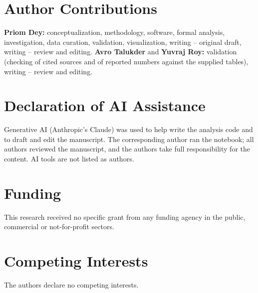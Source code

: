 \documentclass[11pt,a4paper]{article}
\begin{document}
\section*{Author Contributions}
\textbf{Priom Dey:} conceptualization, methodology, software, formal analysis, investigation, data curation, validation, visualization, writing -- original draft, writing -- review and editing. \textbf{Avro Talukder} and \textbf{Yuvraj Roy:} validation (checking of cited sources and of reported numbers against the supplied tables), writing -- review and editing.

\section*{Declaration of AI Assistance}
Generative AI (Anthropic's Claude) was used to help write the analysis code and to draft and edit the manuscript. The corresponding author ran the notebook; all authors reviewed the manuscript, and the authors take full responsibility for the content. AI tools are not listed as authors.

\section*{Funding}
This research received no specific grant from any funding agency in the public, commercial or not-for-profit sectors.

\section*{Competing Interests}
The authors declare no competing interests.
\end{document}
